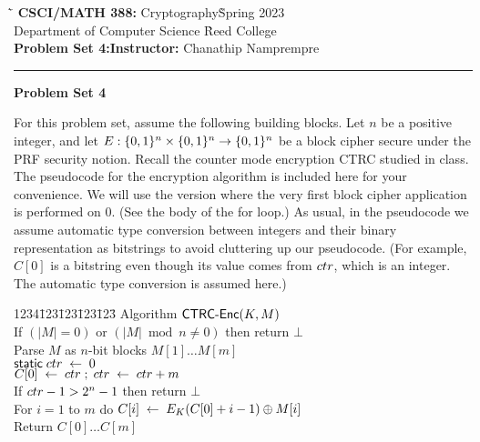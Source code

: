 \documentclass{exam}
\def\COURSENAME{Cryptography}
\def\COURSECODE{CSCI/MATH 388}
\def\YEAR{2023}
\begin{document}
\begin{tabbing}
  \`\=\kill
  \textbf{\COURSECODE:} \COURSENAME \` Spring \YEAR \\
  Department of Computer Science \` Reed College \\
  \textbf{Problem Set 4:}\` \textbf{Instructor:} Chanathip Namprempre
\end{tabbing}


\hrule

\vspace{.4in}

\begin{center}
\textbf{\Large Problem Set 4}
\end{center}


\vspace{.2in}

\noindent For this problem set, assume the following building blocks. Let $n$ be a positive integer, and let $E: \{0,1\}^n \times \{0,1\}^n \rightarrow \{0,1\}^n$ be a block cipher secure under the PRF security notion. Recall the counter mode encryption CTRC studied in class. The pseudocode for the encryption algorithm is included here for your convenience. We will use the version where the very first block cipher application is performed on 0. (See the body of the for loop.) As usual, in the pseudocode we assume automatic type conversion between integers and their binary representation as bitstrings to avoid cluttering up our pseudocode. (For example, $C[0]$ is a bitstring even though its value comes from $ctr$, which is an integer. The automatic type conversion is assumed here.)

  \begin{tabbing}
    1234\=123\=123\=123\=123\=\kill
    Algorithm $\mathsf{CTRC}\mbox{-}\mathsf{Enc}(K,M)$ \\
    \> If $(|M| = 0)$ or $(|M| \bmod n \neq 0)$ then return $\bot$ \\
    \> Parse $M$ as $n$-bit blocks $M[1] \ldots M[m]$ \\
    \> $\mathsf{static} \; ctr \;\leftarrow\; 0$ \\
    \> $C[0] \;\leftarrow\; ctr \;;\;ctr \;\leftarrow\; ctr + m$ \\
    \> If $ctr -1 > 2^n-1$ then return $\bot$ \\
    \> For $i = 1$ to $m$ do $C[i] \;\leftarrow\;  E_K(C[0] + i - 1) \oplus M[i]$ \\
    \> Return $C[0]\ldots C[m]$
  \end{tabbing}
\end{document}
